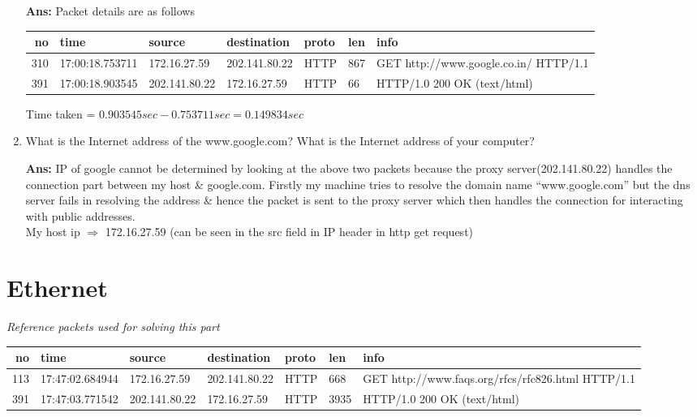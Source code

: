 \documentclass[a4,11pt]{article}
\newenvironment{que}
{ \color{ForestGreen}
  \begin{question}
}
{ \end{question} }
\newenvironment{sol}
{ \color{Black}
  \begin{solution}
}
{ \end{solution} }
\begin{document}
\begin{enumerate}
    \begin{sol}
      \textbf{Ans:} Packet details are as follows \\
      \begin{tabular}{|r|l|l|l|l|l| p{10cm} |}
       \hline
       no&	time&			source&			destination&		proto&	len&	info \\
       \hline
       310& 	17:00:18.753711& 	172.16.27.59& 		202.141.80.22& 		HTTP& 	867& 	GET http://www.google.co.in/ HTTP/1.1 \\
       391& 	17:00:18.903545&	202.141.80.22&		172.16.27.59&		HTTP&	66&	HTTP/1.0 200 OK  (text/html)\\
       \hline
      \end{tabular}

      Time taken = $0.903545sec-0.753711 sec = 0.149834 sec$
    \end{sol}
 
      \item
      \begin{que}
	What is the Internet address of the www.google.com? What is the Internet address of your computer? 
      \end{que}
      
      \begin{sol}
	\textbf{Ans:} IP of google cannot be determined by looking at the above two packets because the proxy server(202.141.80.22) handles
	the connection part between my host \& google.com. Firstly my machine tries to resolve the domain name ``www.google.com''
	but the dns server fails in resolving the address \& hence the packet is sent to the proxy server which then handles 
	the connection for interacting with public addresses.\\
	My host ip $\Rightarrow$ 172.16.27.59 (can be seen in the src field in IP header in http get request)
      \end{sol}
\end{enumerate}
\pagebreak 


\section{Ethernet}
	 
    \textit{Reference packets used for solving this part}\\
      \begin{tabular}{|r|l|l|l|l|l| p{6cm} |}
       \hline
       no&	time&			source&			destination&		proto&	len&	info \\
       \hline
       113& 	17:47:02.684944& 	172.16.27.59& 		202.141.80.22& 		HTTP& 	668& 	GET http://www.faqs.org/rfcs/rfc826.html HTTP/1.1 \\
       391& 	17:47:03.771542&	202.141.80.22&		172.16.27.59&		HTTP&	3935&	HTTP/1.0 200 OK  (text/html)\\
       \hline
      \end{tabular}
	  
\end{document}
